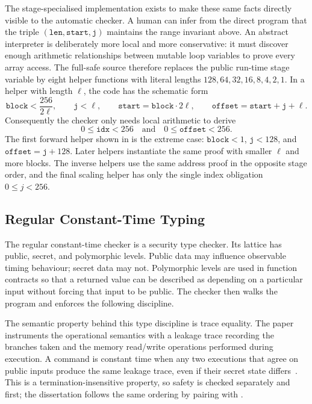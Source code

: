 The stage-specialised implementation exists to make these same facts directly
visible to the automatic checker.  A human can infer from the direct program
that the triple \((\texttt{len},\texttt{start},\texttt{j})\) maintains the
range invariant above.  An abstract interpreter is deliberately more local and
more conservative: it must discover enough arithmetic relationships between
mutable loop variables to prove every array access.  The full-safe source
therefore replaces the public run-time stage variable  by eight
helper functions with literal lengths \(128,64,32,16,8,4,2,1\).  In a helper
with length \(\ell\), the code has the schematic form
\[
  \texttt{block}<\frac{256}{2\ell},\qquad
  \texttt{j}<\ell,\qquad
  \texttt{start}=\texttt{block}\cdot 2\ell,\qquad
  \texttt{offset}=\texttt{start}+\texttt{j}+\ell.
\]
Consequently the checker only needs local arithmetic to derive
\[
  0 \leq \texttt{idx} < 256
  \quad\text{and}\quad
  0 \leq \texttt{offset} < 256.
\]
The first forward helper shown in  is the
extreme case: \(\texttt{block}<1\), \(\texttt{j}<128\), and
\(\texttt{offset}=\texttt{j}+128\).  Later helpers instantiate the same proof
with smaller \(\ell\) and more blocks.  The inverse helpers use the same
address proof in the opposite stage order, and the final scaling helper has
only the single index obligation \(0\leq j<256\).

\subsection{Regular Constant-Time Typing}

The regular constant-time checker is a security type checker.  Its lattice has
public, secret, and polymorphic levels.  Public data may influence observable
timing behaviour; secret data may not.  Polymorphic levels are used in
function contracts so that a returned value can be described as depending on a
particular input without forcing that input to be public.  The checker then
walks the program and enforces the following discipline.

The semantic property behind this type discipline is trace equality.  The
\jasmin{} paper instruments the operational semantics with a leakage trace
recording the branches taken and the memory read/write operations performed
during execution.  A command is constant time when any two executions that
agree on public inputs produce the same leakage trace, even if their secret
state differs~\cite{Almeida2017}.  This is a termination-insensitive property,
so safety is checked separately and first; the dissertation follows the same
ordering by pairing  with .

